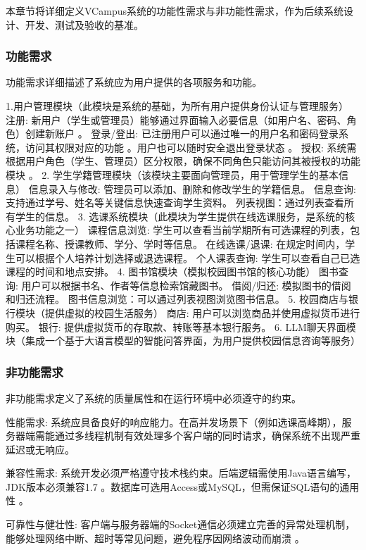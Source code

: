 本章节将详细定义VCampus系统的功能性需求与非功能性需求，作为后续系统设计、开发、测试及验收的基准。

\subsubsection{功能需求}

功能需求详细描述了系统应为用户提供的各项服务和功能。

1.用户管理模块（此模块是系统的基础，为所有用户提供身份认证与管理服务）
注册: 新用户（学生或管理员）能够通过界面输入必要信息（如用户名、密码、角色）创建新账户 。
登录/登出: 已注册用户可以通过唯一的用户名和密码登录系统，访问其权限对应的功能 。用户也可以随时安全退出登录状态 。
授权: 系统需根据用户角色（学生、管理员）区分权限，确保不同角色只能访问其被授权的功能模块 。
2. 学生学籍管理模块（该模块主要面向管理员，用于管理学生的基本信息）
信息录入与修改: 管理员可以添加、删除和修改学生的学籍信息。
信息查询: 支持通过学号、姓名等关键信息快速查询学生资料。
列表视图：通过列表查看所有学生的信息。
3. 选课系统模块（此模块为学生提供在线选课服务，是系统的核心业务功能之一）
课程信息浏览: 学生可以查看当前学期所有可选课程的列表，包括课程名称、授课教师、学分、学时等信息。
在线选课/退课: 在规定时间内，学生可以根据个人培养计划选择或退选课程。
个人课表查询: 学生可以查看自己已选课程的时间和地点安排。
4. 图书馆模块（模拟校园图书馆的核心功能）
图书查询: 用户可以根据书名、作者等信息检索馆藏图书。
借阅/归还: 模拟图书的借阅和归还流程。
图书信息浏览：可以通过列表视图浏览图书信息。
5. 校园商店与银行模块（提供虚拟的校园生活服务）
商店: 用户可以浏览商品并使用虚拟货币进行购买。
银行: 提供虚拟货币的存取款、转账等基本银行服务。
6. LLM聊天界面模块（集成一个基于大语言模型的智能问答界面，为用户提供校园信息咨询等服务）

\subsubsection{非功能需求}

非功能需求定义了系统的质量属性和在运行环境中必须遵守的约束。

性能需求: 系统应具备良好的响应能力。在高并发场景下（例如选课高峰期），服务器端需能通过多线程机制有效处理多个客户端的同时请求，确保系统不出现严重延迟或无响应。

兼容性需求: 系统开发必须严格遵守技术栈约束。后端逻辑需使用Java语言编写，JDK版本必须兼容1.7 。数据库可选用Access或MySQL，但需保证SQL语句的通用性 。

可靠性与健壮性: 客户端与服务器端的Socket通信必须建立完善的异常处理机制，能够处理网络中断、超时等常见问题，避免程序因网络波动而崩溃 。

